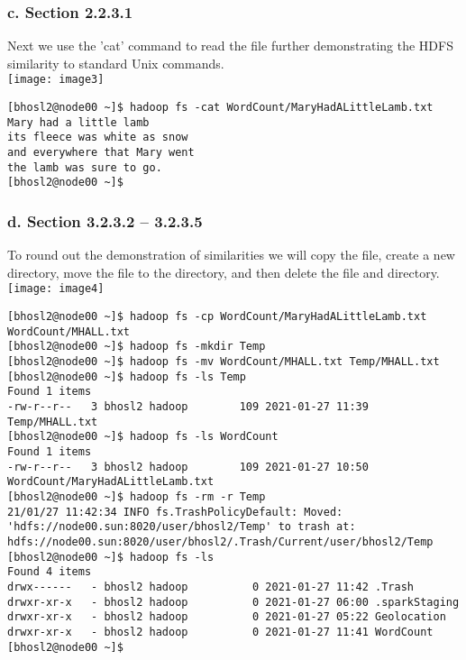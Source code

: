 \documentclass[]{article}
\begin{document}
\vspace{-1em}
\subsubsection*{c. Section 2.2.3.1} \vspace{-0.5em}
Next we use the 'cat' command to read the file further demonstrating the HDFS similarity to standard Unix commands.\\
\texttt{[image: image3]} \vspace{-2em}
\begin{verbatim}
[bhosl2@node00 ~]$ hadoop fs -cat WordCount/MaryHadALittleLamb.txt
Mary had a little lamb
its fleece was white as snow
and everywhere that Mary went
the lamb was sure to go.
[bhosl2@node00 ~]$
\end{verbatim}

\subsubsection*{d. Section 3.2.3.2 – 3.2.3.5}
To round out the demonstration of similarities we will copy the file, create a new directory, move the file to the directory, and then delete the file and directory.\\
\texttt{[image: image4]} \vspace{-1.5em}
\begin{verbatim}
[bhosl2@node00 ~]$ hadoop fs -cp WordCount/MaryHadALittleLamb.txt WordCount/MHALL.txt
[bhosl2@node00 ~]$ hadoop fs -mkdir Temp
[bhosl2@node00 ~]$ hadoop fs -mv WordCount/MHALL.txt Temp/MHALL.txt
[bhosl2@node00 ~]$ hadoop fs -ls Temp
Found 1 items
-rw-r--r--   3 bhosl2 hadoop        109 2021-01-27 11:39 Temp/MHALL.txt
[bhosl2@node00 ~]$ hadoop fs -ls WordCount
Found 1 items
-rw-r--r--   3 bhosl2 hadoop        109 2021-01-27 10:50 WordCount/MaryHadALittleLamb.txt
[bhosl2@node00 ~]$ hadoop fs -rm -r Temp
21/01/27 11:42:34 INFO fs.TrashPolicyDefault: Moved: 'hdfs://node00.sun:8020/user/bhosl2/Temp' to trash at: hdfs://node00.sun:8020/user/bhosl2/.Trash/Current/user/bhosl2/Temp
[bhosl2@node00 ~]$ hadoop fs -ls
Found 4 items
drwx------   - bhosl2 hadoop          0 2021-01-27 11:42 .Trash
drwxr-xr-x   - bhosl2 hadoop          0 2021-01-27 06:00 .sparkStaging
drwxr-xr-x   - bhosl2 hadoop          0 2021-01-27 05:22 Geolocation
drwxr-xr-x   - bhosl2 hadoop          0 2021-01-27 11:41 WordCount
[bhosl2@node00 ~]$
\end{verbatim}
\end{document}
